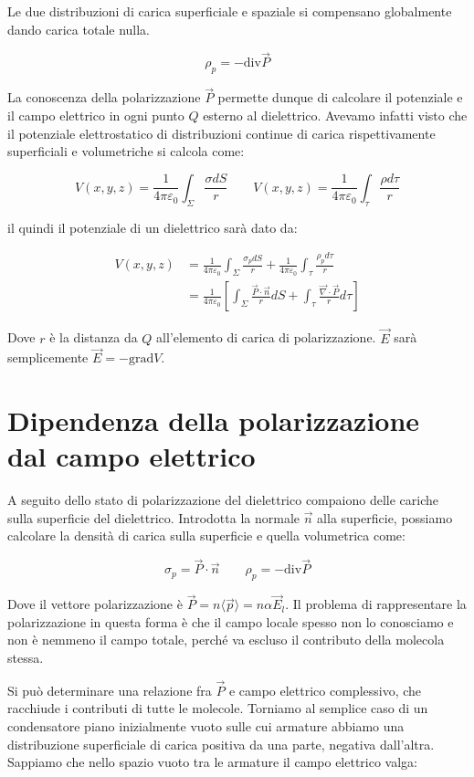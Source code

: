 Le due distribuzioni di carica superficiale e spaziale si compensano globalmente dando carica totale nulla.

\[
	\boxed{\rho_p = - \text{div}\vec{P}}
\]

La conoscenza della polarizzazione $\vec{P}$ permette dunque di calcolare il potenziale e il campo elettrico in ogni punto $Q$ esterno al dielettrico. Avevamo infatti visto che il potenziale elettrostatico di distribuzioni continue di carica rispettivamente superficiali e volumetriche si calcola come:

\[
	V(x,y,z) = \frac{1}{4\pi \varepsilon_0}\int_{\Sigma}\frac{\sigma dS}{r} \qquad V(x,y,z) = \frac{1}{4\pi \varepsilon_0} \int_{\tau} \frac{\rho d\tau}{r}
\]

il quindi il potenziale di un dielettrico sarà dato da:

\begin{align*}
	V(x,y,z) &= \frac{1}{4\pi \varepsilon_0}\int_{\Sigma}\frac{\sigma_p  dS}{r} + \frac{1}{4\pi \varepsilon_0} \int_{\tau} \frac{\rho_p  d\tau}{r} \\
	&= \frac{1}{4\pi \varepsilon_0} \left[ \int_{\Sigma}\frac{\vec{P} \cdot \vec{n}}{r}dS + \int_{\tau}\frac{\vec{\nabla} \cdot \vec{P}}{r} d\tau  \right]
\end{align*}

Dove $r$ è la distanza da $Q$ all'elemento di carica di polarizzazione. $\vec{E}$ sarà semplicemente $ \vec{E} = - \text{grad}V $.

\section{Dipendenza della polarizzazione dal campo elettrico}

A seguito dello stato di polarizzazione del dielettrico compaiono delle cariche sulla superficie del dielettrico. Introdotta la normale $\vec{n}$ alla superficie, possiamo calcolare la densità di carica sulla superficie e quella volumetrica come:

\[
	\sigma_p = \vec{P} \cdot \vec{n}  \qquad \rho_p=-\text{div}\vec{P}
\]

Dove il vettore polarizzazione è $\vec{P} = n \langle \vec{p} \rangle = n\alpha \vec{E}_l$.
Il problema di rappresentare la polarizzazione in questa forma è che il campo locale spesso non lo conosciamo e non è nemmeno il campo totale, perché va escluso il contributo della molecola stessa.

Si può determinare una relazione fra $\vec{P}$ e campo elettrico complessivo, che racchiude i contributi di tutte le molecole. Torniamo al semplice caso di un condensatore piano inizialmente vuoto sulle cui armature abbiamo una distribuzione superficiale di carica positiva da una parte, negativa dall'altra. Sappiamo che nello spazio vuoto tra le armature il campo elettrico valga:

